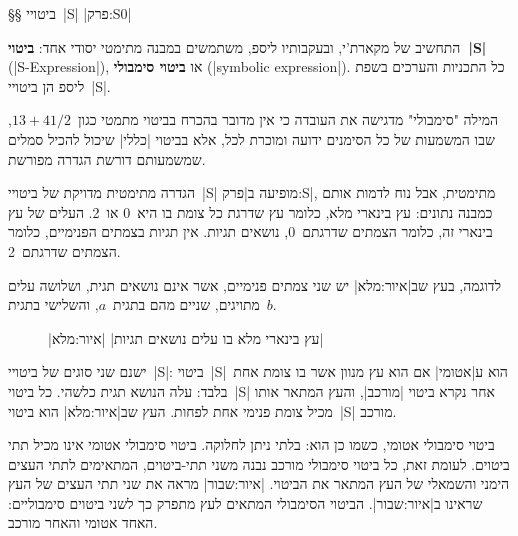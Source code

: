 §§ ביטויי~\E|S|
|פרק:S0|

התחשיב של מקארת'י, ובעקבותיו ליספ, משתמשים במבנה מתימטי יסודי אחד:
\textbf{ביטוי~\E|S|} (\E|S-Expression|), או \textbf{ביטוי סימבולי} (\E|symbolic
expression|). כל התכניות והערכים בשפת ליספ הן ביטויי~\E|S|.

המילה "סימבולי" מדגישה את העובדה כי אין מדובר בהכרח בביטוי מתמטי
כגון~$13+41/2$, שבו המשמעות של כל הסימנים ידועה ומוכרת לכל, אלא בביטוי \E|כללי|
שיכול להכיל סמלים שמשמעותם דורשת הגדרה מפורשת.

הגדרה מתימטית מדויקת של ביטויי~\E|S| מופיעה ב|פרק:S|, מתימטית, אבל נוח
לדמות אותם כמבנה נתונים: עץ בינארי מלא, כלומר עץ שדרגת כל צומת בו היא~0 או~2.
העלים של עץ בינארי זה, כלומר הצמתים שדרגתם~0, נושאים תגיות. אין תגיות בצמתים
הפנימיים, כלומר הצמתים שדרגתם~2.

לדוגמה, בעץ שב|איור:מלא| יש שני צמתים פנימיים, אשר אינם
נושאים תגית, ושלושה עלים מתויגים, שניים מהם בתגית~$a$, והשלישי בתגית~$b$.

\begin{figure}[htbp]
  |עץ בינארי מלא בו עלים נושאים תגיות|
  |איור:מלא|
  \centering
  \begin{LTR}
 \begin{quote}
  \center
\end{quote}
\end{LTR}
\end{figure}

ישנם שני סוגים של ביטויי~\E|S|: ביטוי~\E|S|\ הוא ע|אטומי| אם הוא עץ מנוון אשר
בו צומת אחת בלבד: עלה הנושא תגית כלשהי. כל ביטוי~\E|S| אחר נקרא ביטוי
\ע|מורכב|, והעץ המתאר אותו מכיל צומת פנימי אחת לפחות. העץ שב|איור:מלא| הוא
ביטוי~\E|S| מורכב.

ביטוי סימבולי אטומי, כשמו כן הוא: בלתי ניתן לחלוקה. ביטוי סימבולי אטומי אינו
מכיל תתי ביטוים. לעומת זאת, כל ביטוי סימבולי מורכב נבנה משני תתי-ביטוים,
המתאימים לתתי העצים הימני והשמאלי של העץ המתאר את הביטוי. |איור:שבור| מראה
את שני תתי העצים של העץ שראינו ב|איור:שבור|. הביטוי הסימבולי המתאים לעץ
מתפרק כך לשני ביטוים סימבוליים: האחד אטומי והאחר מורכב.

